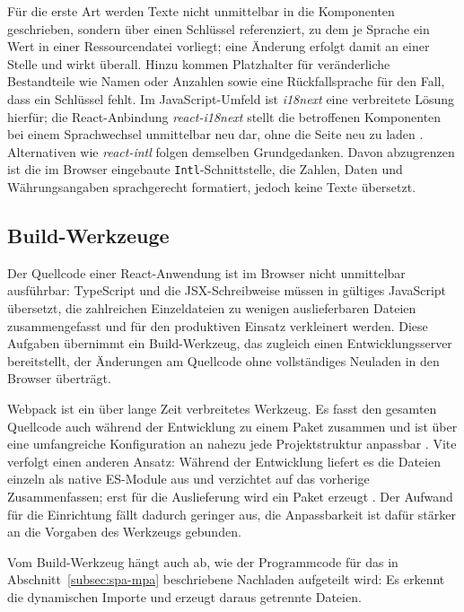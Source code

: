 Für die erste Art werden Texte nicht unmittelbar in die Komponenten
geschrieben, sondern über einen Schlüssel referenziert, zu dem je
Sprache ein Wert in einer Ressourcendatei vorliegt; eine Änderung
erfolgt damit an einer Stelle und wirkt überall. Hinzu kommen
Platzhalter für veränderliche Bestandteile wie Namen oder Anzahlen
sowie eine Rückfallsprache für den Fall, dass ein Schlüssel fehlt. Im
JavaScript-Umfeld ist \textit{i18next} eine verbreitete Lösung
hierfür; die React-Anbindung \textit{react-i18next} stellt die
betroffenen Komponenten bei einem Sprachwechsel unmittelbar neu dar,
ohne die Seite neu zu laden \cite{i18next_docs}. Alternativen wie
\textit{react-intl} folgen demselben Grundgedanken. Davon abzugrenzen
ist die im Browser eingebaute \texttt{Intl}-Schnittstelle, die
Zahlen, Daten und Währungsangaben sprachgerecht formatiert, jedoch
keine Texte übersetzt.

\subsection{Build-Werkzeuge}
\label{subsec:build-werkzeuge}

Der Quellcode einer React-Anwendung ist im Browser nicht unmittelbar
ausführbar: TypeScript und die JSX-Schreibweise müssen in gültiges
JavaScript übersetzt, die zahlreichen Einzeldateien zu wenigen
auslieferbaren Dateien zusammengefasst und für den produktiven Einsatz
verkleinert werden. Diese Aufgaben übernimmt ein Build-Werkzeug, das
zugleich einen Entwicklungsserver bereitstellt, der Änderungen am
Quellcode ohne vollständiges Neuladen in den Browser überträgt.

Webpack ist ein über lange Zeit verbreitetes Werkzeug. Es fasst den
gesamten Quellcode auch während der Entwicklung zu einem Paket
zusammen und ist über eine umfangreiche Konfiguration an nahezu jede
Projektstruktur anpassbar \cite{webpack_docs}. Vite verfolgt einen
anderen Ansatz: Während der Entwicklung liefert es die Dateien
einzeln als native ES-Module aus und verzichtet auf das vorherige
Zusammenfassen; erst für die Auslieferung wird ein Paket erzeugt
\cite{vite_docs}. Der Aufwand für die Einrichtung fällt dadurch
geringer aus, die Anpassbarkeit ist dafür stärker an die Vorgaben des
Werkzeugs gebunden.

Vom Build-Werkzeug hängt auch ab, wie der Programmcode für das in
Abschnitt~\ref{subsec:spa-mpa} beschriebene Nachladen aufgeteilt wird:
Es erkennt die dynamischen Importe und erzeugt daraus getrennte
Dateien.
